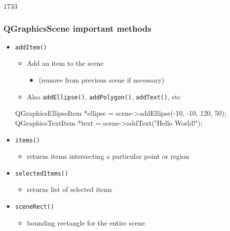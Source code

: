 \begin{slide}[fragile]{1733}
\frametitle{QGraphicsScene important methods}

\begin{itemize}
\item \texttt{addItem()}
    \begin{itemize}
    \item Add an item to the scene
        \begin{itemize}
        \item (remove from previous scene if necessary)
        \end{itemize}
    \item Also \texttt{addEllipse()}, \texttt{addPolygon()}, \texttt{addText()}, etc 
    \end{itemize}
\begin{cpp}

    QGraphicsEllipseItem *ellipse = 
        scene->addEllipse(-10, -10, 120, 50);
    QGraphicsTextItem *text = 
        scene->addText("Hello World!");
\end{cpp}    
\item \texttt{items()}
    \begin{itemize}
    \item returns items intersecting a particular point or region
    \end{itemize}

\item \texttt{selectedItems()}
    \begin{itemize}
    \item returns list of selected items
    \end{itemize}
\item \texttt{sceneRect()}
    \begin{itemize}
    \item bounding rectangle for the entire scene
    \end{itemize}
\end{itemize}


\end{slide}




